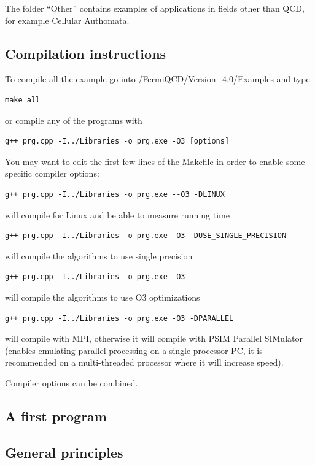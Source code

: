 The folder ``Other'' contains examples of applications in fields other than
QCD, for example Cellular Authomata.

\subsection{Compilation instructions}

To compile all the example go into /FermiQCD/Version\_4.0/Examples and type
\begin{verbatim}
make all
\end{verbatim}

or compile any of the programs with
\begin{verbatim}
g++ prg.cpp -I../Libraries -o prg.exe -O3 [options]
\end{verbatim}

You may want to edit the first few lines of the Makefile in order to enable
some specific compiler options:
\begin{verbatim}
g++ prg.cpp -I../Libraries -o prg.exe --O3 -DLINUX
\end{verbatim}

will compile for Linux and be able to measure running time
\begin{verbatim}
g++ prg.cpp -I../Libraries -o prg.exe -O3 -DUSE_SINGLE_PRECISION
\end{verbatim}

will compile the algorithms to use single precision
\begin{verbatim}
g++ prg.cpp -I../Libraries -o prg.exe -O3
\end{verbatim}

will compile the algorithms to use O3 optimizations
\begin{verbatim}
g++ prg.cpp -I../Libraries -o prg.exe -O3 -DPARALLEL
\end{verbatim}

will compile with MPI, otherwise it will compile with PSIM Parallel
SIMulator (enables emulating parallel processing on a single processor PC,
it is recommended on a multi-threaded processor where it will increase
speed).

Compiler options can be combined.

\subsection{A first program}

\subsection{General principles}

